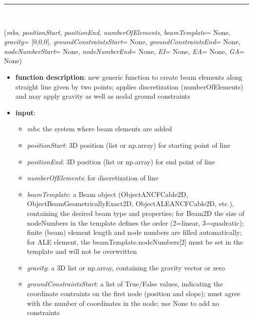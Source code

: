 \begin{itemize}[leftmargin=1.4cm]
\begin{itemize}[leftmargin=1.4cm]
\begin{itemize}[leftmargin=1.4cm]
\begin{itemize}[leftmargin=0.5cm]
\begin{itemize}[leftmargin=1.4cm]
%
\noindent\rule{8cm}{0.75pt}\vspace{1pt} \\ 
\begin{flushleft}
\label{sec:beams:GenerateBeamElementsAlongLine}
({\it mbs}, {\it positionStart}, {\it positionEnd}, {\it numberOfElements}, {\it beamTemplate}= None, {\it gravity}= [0,0,0], {\it groundConstraintsStart}= None, {\it groundConstraintsEnd}= None, {\it nodeNumberStart}= None, {\it nodeNumberEnd}= None, {\it EI}= None, {\it EA}= None, {\it GA}= None)
\end{flushleft}
\setlength{\itemindent}{0.7cm}
\begin{itemize}[leftmargin=0.7cm]
\item[--]
{\bf function description}: new generic function to create beam elements along straight line given by two points; applies discretization (numberOfElements) and may apply gravity as well as nodal ground constraints
\item[--]
{\bf input}: \vspace{-6pt}
\begin{itemize}[leftmargin=1.2cm]
\setlength{\itemindent}{-0.7cm}
\item[]{\it mbs}: the system where beam elements are added
\item[]{\it positionStart}: 3D position (list or np.array) for starting point of line
\item[]{\it positionEnd}: 3D position (list or np.array) for end point of line
\item[]{\it numberOfElements}: for discretization of line
\item[]{\it beamTemplate}: a Beam object (ObjectANCFCable2D, ObjectBeamGeometricallyExact2D, ObjectALEANCFCable2D, etc.), containing the desired beam type and properties; for Beam2D the size of nodeNumbers in the template defines the order (2=linear, 3=quadratic); finite (beam) element length and node numbers are filled automatically; for ALE element, the beamTemplate.nodeNumbers[2] must be set in the template and will not be overwritten
\item[]{\it gravity}: a 3D list or np.array, containing the gravity vector or zero
\item[]{\it groundConstraintsStart}: a list of True/False values, indicating the coordinate contraints on the first node (position and slope); must agree with the number of coordinates in the node; use None to add no constraints

\end{itemize}
\end{itemize}
\end{itemize}
\end{itemize}
\end{itemize}
\end{itemize}
\end{itemize}
